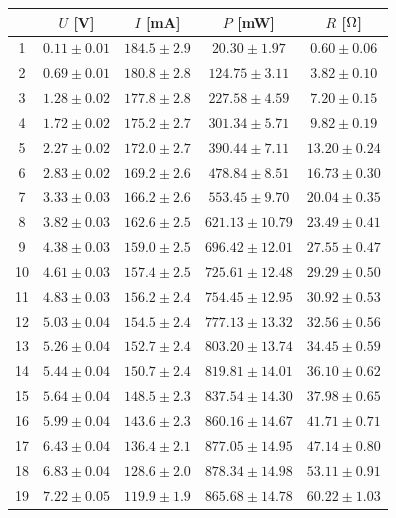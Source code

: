 \begin{table}[!h]
\begin{center}
\begin{tabular}{|c|c|c|c|c|}
\hline
& $U$ [V] & $I$ [mA] & $P$ [mW] & $R$ [$\rm \Omega$] \\
\hline
1	&	$0.11 \pm 0.01$	&	$184.5 \pm 2.9$	&	$20.30 \pm 1.97$	&	$0.60 \pm 0.06$	\\
\hline
2	&	$0.69 \pm 0.01$	&	$180.8 \pm 2.8$	&	$124.75 \pm 3.11$	&	$3.82 \pm 0.10$	\\
\hline
3	&	$1.28 \pm 0.02$	&	$177.8 \pm 2.8$	&	$227.58 \pm 4.59$	&	$7.20 \pm 0.15$	\\
\hline
4	&	$1.72 \pm 0.02$	&	$175.2 \pm 2.7$	&	$301.34 \pm 5.71$	&	$9.82 \pm 0.19$	\\
\hline
5	&	$2.27 \pm 0.02$	&	$172.0 \pm 2.7$	&	$390.44 \pm 7.11$	&	$13.20 \pm 0.24$	\\
\hline
6	&	$2.83 \pm 0.02$	&	$169.2 \pm 2.6$	&	$478.84 \pm 8.51$	&	$16.73 \pm 0.30$	\\
\hline
7	&	$3.33 \pm 0.03$	&	$166.2 \pm 2.6$	&	$553.45 \pm 9.70$	&	$20.04 \pm 0.35$	\\
\hline
8	&	$3.82 \pm 0.03$	&	$162.6 \pm 2.5$	&	$621.13 \pm 10.79$	&	$23.49 \pm 0.41$	\\
\hline
9	&	$4.38 \pm 0.03$	&	$159.0 \pm 2.5$	&	$696.42 \pm 12.01$	&	$27.55 \pm 0.47$	\\
\hline
10	&	$4.61 \pm 0.03$	&	$157.4 \pm 2.5$	&	$725.61 \pm 12.48$	&	$29.29 \pm 0.50$	\\
\hline
11	&	$4.83 \pm 0.03$	&	$156.2 \pm 2.4$	&	$754.45 \pm 12.95$	&	$30.92 \pm 0.53$	\\
\hline
12	&	$5.03 \pm 0.04$	&	$154.5 \pm 2.4$	&	$777.13 \pm 13.32$	&	$32.56 \pm 0.56$	\\
\hline
13	&	$5.26 \pm 0.04$	&	$152.7 \pm 2.4$	&	$803.20 \pm 13.74$	&	$34.45 \pm 0.59$	\\
\hline
14	&	$5.44 \pm 0.04$	&	$150.7 \pm 2.4$	&	$819.81 \pm 14.01$	&	$36.10 \pm 0.62$	\\
\hline
15	&	$5.64 \pm 0.04$	&	$148.5 \pm 2.3$	&	$837.54 \pm 14.30$	&	$37.98 \pm 0.65$	\\
\hline
16	&	$5.99 \pm 0.04$	&	$143.6 \pm 2.3$	&	$860.16 \pm 14.67$	&	$41.71 \pm 0.71$	\\
\hline
17	&	$6.43 \pm 0.04$	&	$136.4 \pm 2.1$	&	$877.05 \pm 14.95$	&	$47.14 \pm 0.80$	\\
\hline
18	&	$6.83 \pm 0.04$	&	$128.6 \pm 2.0$	&	$878.34 \pm 14.98$	&	$53.11 \pm 0.91$	\\
\hline
19	&	$7.22 \pm 0.05$	&	$119.9 \pm 1.9$	&	$865.68 \pm 14.78$	&	$60.22 \pm 1.03$	\\

\end{tabular}
\end{center}
\end{table}
